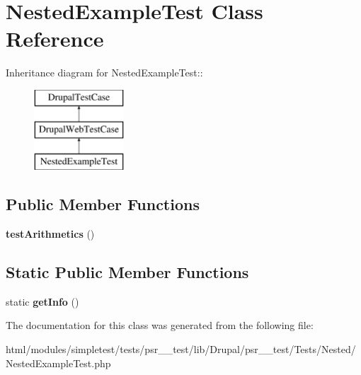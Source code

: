 \hypertarget{classNestedExampleTest}{
\section{NestedExampleTest Class Reference}
\label{classNestedExampleTest}
}
Inheritance diagram for NestedExampleTest::\begin{figure}[H]
\begin{center}
\leavevmode
\includegraphics[height=3cm]{classNestedExampleTest}
\end{center}
\end{figure}
\subsection*{Public Member Functions}
\begin{DoxyCompactItemize}
\item 
\hypertarget{classNestedExampleTest_aedade1b26e84381832076940b81c36e3}{
{\bfseries testArithmetics} ()}
\label{classNestedExampleTest_aedade1b26e84381832076940b81c36e3}

\end{DoxyCompactItemize}
\subsection*{Static Public Member Functions}
\begin{DoxyCompactItemize}
\item 
\hypertarget{classNestedExampleTest_a2b48ecc5b5c87f068ce539d504c33d46}{
static {\bfseries getInfo} ()}
\label{classNestedExampleTest_a2b48ecc5b5c87f068ce539d504c33d46}

\end{DoxyCompactItemize}


The documentation for this class was generated from the following file:\begin{DoxyCompactItemize}
\item 
html/modules/simpletest/tests/psr\_\_\-test/lib/Drupal/psr\_\_\-test/Tests/Nested/NestedExampleTest.php\end{DoxyCompactItemize}
